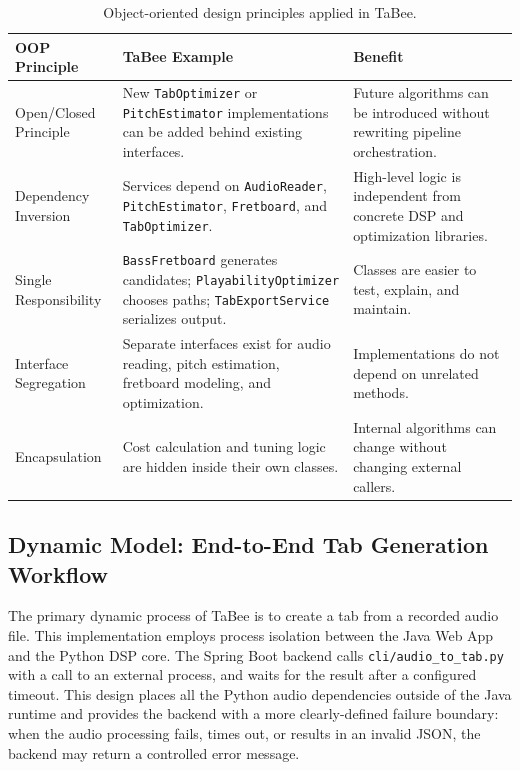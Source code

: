 \documentclass[a4paper, 12pt, titlepage]{article}
\begin{document}
\begin{table}[H]
    \centering
    \begin{tabular}{|p{}|p{}|p{}|}
        \hline
        \textbf{OOP Principle} & \textbf{TaBee Example} & \textbf{Benefit} \\
        \hline
        Open/Closed Principle & New \texttt{TabOptimizer} or \texttt{PitchEstimator} implementations can be added behind existing interfaces. & Future algorithms can be introduced without rewriting pipeline orchestration. \\
        \hline
        Dependency Inversion & Services depend on \texttt{AudioReader}, \texttt{PitchEstimator}, \texttt{Fretboard}, and \texttt{TabOptimizer}. & High-level logic is independent from concrete DSP and optimization libraries. \\
        \hline
        Single Responsibility & \texttt{BassFretboard} generates candidates; \texttt{PlayabilityOptimizer} chooses paths; \texttt{TabExportService} serializes output. & Classes are easier to test, explain, and maintain. \\
        \hline
        Interface Segregation & Separate interfaces exist for audio reading, pitch estimation, fretboard modeling, and optimization. & Implementations do not depend on unrelated methods. \\
        \hline
        Encapsulation & Cost calculation and tuning logic are hidden inside their own classes. & Internal algorithms can change without changing external callers. \\
        \hline
    \end{tabular}
    \caption{Object-oriented design principles applied in TaBee.}
    \label{tab:tabee_oop_principles}
\end{table}

\subsection{Dynamic Model: End-to-End Tab Generation Workflow}

The primary dynamic process of TaBee is to create a tab from a recorded audio file. This implementation employs process isolation between the Java Web App and the Python DSP core. The Spring Boot backend calls \texttt{cli/audio\_to\_tab.py} with a call to an external process, and waits for the result after a configured timeout. This design places all the Python audio dependencies outside of the Java runtime and provides the backend with a more clearly-defined failure boundary: when the audio processing fails, times out, or results in an invalid JSON, the backend may return a controlled error message.
\end{document}

